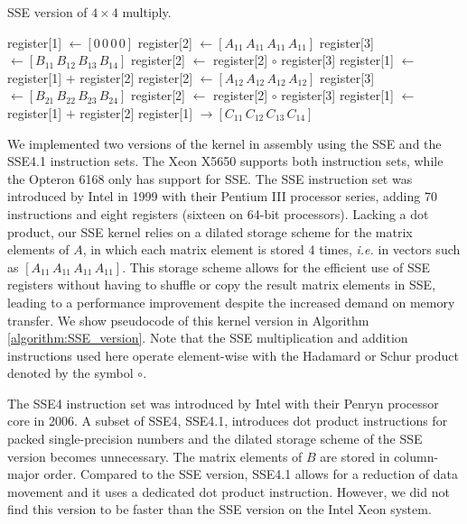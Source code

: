 \begin{algorithm}
\caption{\label{algorithm:SSE_version} SSE version of $4 \times 4$ multiply.}
\begin{algorithmic}[1]
\STATE register[1] $\leftarrow [ 0 \, 0 \, 0 \, 0 ]$
\STATE register[2] $\leftarrow [ A_{11} \, A_{11} \, A_{11} \, A_{11} ]$
\STATE register[3] $\leftarrow [ B_{11} \, B_{12} \, B_{13} \, B_{14} ]$
\STATE register[2] $\leftarrow$ register[2] $\circ$ register[3]
\STATE register[1] $\leftarrow$ register[1] $+$ register[2]
\STATE register[2] $\leftarrow [ A_{12} \, A_{12} \, A_{12} \, A_{12} ]$
\STATE register[3] $\leftarrow [ B_{21} \, B_{22} \, B_{23} \, B_{24} ]$
\STATE register[2] $\leftarrow$ register[2] $\circ$ register[3]
\STATE register[1] $\leftarrow$ register[1] $+$ register[2]
\STATE register[1] $\rightarrow [ C_{11} \, C_{12} \, C_{13} \, C_{14} ]$
\end{algorithmic}
\end{algorithm}

We implemented two versions of the kernel in assembly using the SSE and the
SSE4.1 instruction sets. The Xeon X5650 supports both instruction sets, while
the Opteron 6168 only has support for SSE.  The SSE instruction set was
introduced by Intel in 1999 with their Pentium III processor series, adding 70
instructions and eight registers (sixteen on 64-bit processors).  Lacking a
dot product, our SSE kernel relies on a dilated storage scheme for the matrix
elements of $A$, in which each matrix element is stored 4 times, {\it i.e.} in
vectors such as $[ A_{11} \, A_{11} \, A_{11} \, A_{11} ]$. This storage
scheme allows for the efficient use of SSE registers without having to shuffle
or copy the result matrix elements in SSE, leading to a performance
improvement despite the increased demand on memory transfer.  We show
pseudocode of this kernel version in Algorithm \ref{algorithm:SSE_version}.
Note that the SSE multiplication and addition instructions used here operate
element-wise with the Hadamard or Schur product denoted by the symbol $\circ$.

The SSE4 instruction set was introduced by Intel with their Penryn processor
core in 2006. A subset of SSE4, SSE4.1, introduces dot product instructions for
packed single-precision numbers and the dilated storage scheme of the SSE
version becomes unnecessary. The matrix elements of $B$ are stored in
column-major order.  Compared to the SSE version, SSE4.1 allows for a
reduction of data movement and it uses a dedicated dot product instruction.
However, we did not find this version to be faster than the SSE version on the
Intel Xeon system.

